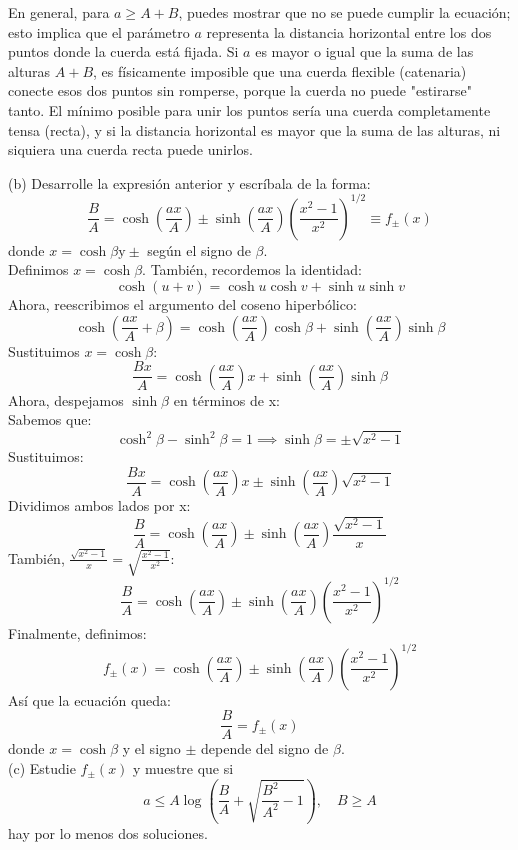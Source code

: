 \documentclass{article}
\theoremstyle{nonumberplain}
\begin{document}
En general, para \( a \geq A + B \), puedes mostrar que no se puede cumplir la ecuación; esto implica que el parámetro \( a \) representa la distancia horizontal entre los dos puntos donde la cuerda está fijada. Si \( a \) es mayor o igual que la suma de las alturas \( A + B \), es físicamente imposible que una cuerda flexible (catenaria) conecte esos dos puntos sin romperse, porque la cuerda no puede "estirarse" tanto. El mínimo posible para unir los puntos sería una cuerda completamente tensa (recta), y si la distancia horizontal es mayor que la suma de las alturas, ni siquiera una cuerda recta puede unirlos.

(b) Desarrolle la expresión anterior y escríbala de la forma:
\[
\frac{B}{A}=\cosh \left(\frac{a x}{A}\right) \pm \sinh \left(\frac{a x}{A}\right)\left(\frac{x^{2}-1}{x^{2}}\right)^{1 / 2} \equiv f_{ \pm}(x)
\]
donde \( x=\cosh \beta \mathrm{y} \pm \) según el signo de \( \beta \). \\

Definimos \( x = \cosh \beta \).
También, recordemos la identidad:
\[
\cosh(u + v) = \cosh u \cosh v + \sinh u \sinh v
\]
Ahora, reescribimos el argumento del coseno hiperbólico:
\[
\cosh\left(\frac{a x}{A} + \beta\right) = \cosh\left(\frac{a x}{A}\right)\cosh \beta + \sinh\left(\frac{a x}{A}\right)\sinh \beta
\]
Sustituimos \( x = \cosh \beta \):
\[
\frac{B x}{A} = \cosh\left(\frac{a x}{A}\right)x + \sinh\left(\frac{a x}{A}\right)\sinh \beta
\]
Ahora, despejamos \(\sinh \beta\) en términos de x: \\
Sabemos que:
\[
\cosh^2 \beta - \sinh^2 \beta = 1 \implies \sinh \beta = \pm \sqrt{x^2 - 1}
\]
Sustituimos:
\[
\frac{B x}{A} = \cosh\left(\frac{a x}{A}\right)x \pm \sinh\left(\frac{a x}{A}\right)\sqrt{x^2 - 1}
\]
Dividimos ambos lados por x:
\[
\frac{B}{A} = \cosh\left(\frac{a x}{A}\right) \pm \sinh\left(\frac{a x}{A}\right)\frac{\sqrt{x^2 - 1}}{x}
\]
También, \(\frac{\sqrt{x^2 - 1}}{x} = \sqrt{\frac{x^2 - 1}{x^2}}\):
\[
\frac{B}{A} = \cosh\left(\frac{a x}{A}\right) \pm \sinh\left(\frac{a x}{A}\right) \left(\frac{x^2 - 1}{x^2}\right)^{1/2}
\]
Finalmente, definimos:
\[
f_{\pm}(x) = \cosh\left(\frac{a x}{A}\right) \pm \sinh\left(\frac{a x}{A}\right) \left(\frac{x^2 - 1}{x^2}\right)^{1/2}
\]
Así que la ecuación queda:
\[
\boxed{
\frac{B}{A} = f_{\pm}(x)
}
\]
donde \( x = \cosh \beta \) y el signo \(\pm\) depende del signo de \(\beta\). \\

(c) Estudie \( f_{ \pm}(x) \) y muestre que si
\[
a \leq A \log \left(\frac{B}{A}+\sqrt{\frac{B^{2}}{A^{2}}-1}\right), \quad B \geq A
\]
hay por lo menos dos soluciones. \\
\end{document}
